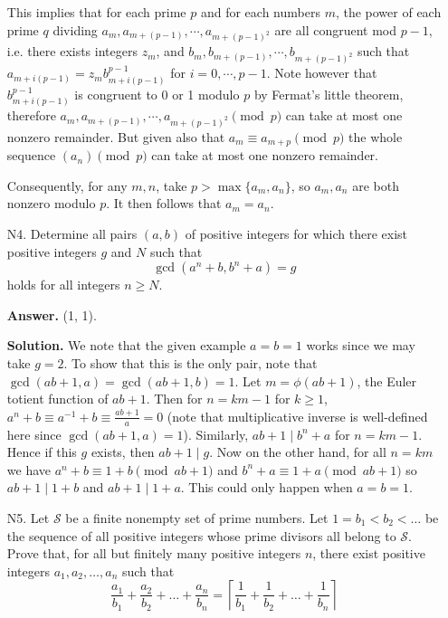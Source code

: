 \documentclass[11pt,a4paper]{article}
\begin{document}
\begin{enumerate}
    	This implies that for each prime $p$ and for each numbers $m$, the power of each prime $q$ dividing $a_m, a_{m + (p - 1)}, \cdots, a_{m + (p-1)^2}$ are all congruent mod $p - 1$, 
    	i.e. there exists integers $z_m$, and 
    	$b_m, b_{m + (p - 1)}, \cdots, b_{m + (p-1)^2}$ such that 
    	$a_{m + i(p-1)} = z_m b_{m + i(p-1)}^{p-1}$ for $i=0, \cdots, p-1$. 
    	Note however that $b_{m + i(p-1)}^{p-1}$ is congruent to 0 or 1 modulo $p$ by Fermat's little theorem, 
    	therefore $a_m, a_{m + (p - 1)}, \cdots, a_{m + (p-1)^2}\pmod{p}$ can take at most one nonzero remainder. 
    	But given also that $a_m\equiv a_{m+p}\pmod{p}$ the whole sequence $(a_n)\pmod{p}$ can take at most one nonzero remainder. 
    	
    	Consequently, for any $m, n$, take $p > \max\{a_m, a_n\}$, 
    	so $a_m, a_n$ are both nonzero modulo $p$. 
    	It then follows that $a_m = a_n$. 
    	
    	\item [N4.]
    	Determine all pairs $(a,b)$ of positive integers for which there exist positive integers $g$ and $N$ such that
    	$$\gcd (a^n+b,b^n+a)=g$$holds for all integers $n\geqslant N.$
    	
    	\textbf{Answer.} (1, 1). 
    	
    	\textbf{Solution.} We note that the given example $a=b=1$ works since we may take $g=2$. 
    	To show that this is the only pair, 
    	note that $\gcd(ab+1, a)=\gcd(ab+1, b)=1$. 
    	Let $m=\phi(ab+1)$, the Euler totient function of $ab+1$. 
    	Then for $n=km-1$ for $k\ge 1$, 
    	$a^n+b\equiv a^{-1}+b\equiv \frac{ab+1}{a}=0$ 
    	(note that multiplicative inverse is well-defined here since $\gcd(ab+1, a)=1$). 
    	Similarly, 
    	$ab+1 \mid b^n+a$ for $n=km-1$. 
    	Hence if this $g$ exists, then $ab+1 \mid g$. 
    	Now on the other hand, for all $n=km$ we have 
    	$a^n+b\equiv 1 + b\pmod{ab+1}$ 
    	and $b^n+a\equiv 1 + a\pmod{ab+1}$
    	so $ab+1\mid 1+b$ and $ab+1\mid 1 + a$. 
    	This could only happen when $a=b=1$. 
    	
    	\item [N5.] 
    	Let $\mathcal{S}$ be a finite nonempty set of prime numbers. Let $1 = b_1 < b_2 < \dots$ be the sequence of all positive integers whose prime divisors all belong to $\mathcal{S}$. Prove that, for all but finitely many positive integers $n$, there exist positive integers $a_1, a_2, \dots, a_n$ such that
    	\[
    	\frac{a_1}{b_1} + \frac{a_2}{b_2} + \dots + \frac{a_n}{b_n} = \left\lceil \frac{1}{b_1} + \frac{1}{b_2} + \dots + \frac{1}{b_n} \right\rceil
    	\]
    	

\end{enumerate}
\end{document}

